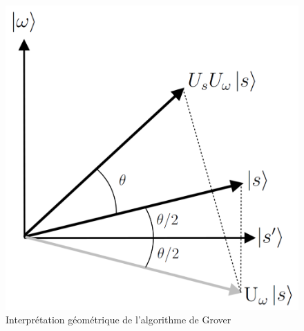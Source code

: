 \begin{figure}
\centering
\includegraphics[scale=0.5]{Grovers_algorithm_geometry}
\caption{Interprétation géométrique  de l'algorithme de Grover}
\label{fig:grover}
\end{figure}




